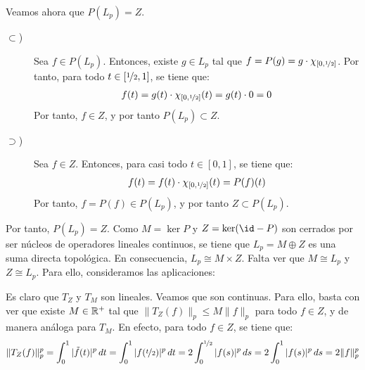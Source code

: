 \begin{ejercicio}
    Veamos ahora que $P(L_p) = Z$.
    \begin{description}
        \item[$\subset$)] Sea $f \in P(L_p)$. Entonces, existe $g \in L_p$ tal que $f = P(g) = g\cdot \chi_{[0, \nicefrac{1}{2}]}$. Por tanto, para todo $t \in [\nicefrac{1}{2}, 1]$, se tiene que:
        \begin{align*}
            f(t) = g(t)\cdot \chi_{[0, \nicefrac{1}{2}]}(t) = g(t)\cdot 0 = 0
        \end{align*}
        Por tanto, $f \in Z$, y por tanto $P(L_p) \subset Z$.
        \item[$\supset$)] Sea $f \in Z$. Entonces, para casi todo $t \in [0, 1]$, se tiene que:
        \begin{align*}
            f(t) = f(t)\cdot \chi_{[0, \nicefrac{1}{2}]}(t) = P(f)(t)
        \end{align*}
        Por tanto, $f = P(f) \in P(L_p)$, y por tanto $Z \subset P(L_p)$. 
    \end{description}

    Por tanto, $P(L_p) = Z$. Como $M=\ker P$ y $Z=\ker(\id - P)$ son cerrados por ser núcleos de operadores lineales continuos, se tiene que $L_p = M \oplus Z$ es una suma directa topológica. En consecuencia, $L_p\cong M \times Z$. Falta ver que $M \cong L_p$ y $Z \cong L_p$. Para ello, consideramos las aplicaciones:

    Es claro que $T_Z$ y $T_M$ son lineales. Veamos que son continuas. Para ello, basta con ver que existe $M \in \mathbb{R}^+$ tal que $\|T_Z(f)\|_p \leq M \|f\|_p$ para todo $f \in Z$, y de manera análoga para $T_M$. En efecto, para todo $f \in Z$, se tiene que:
    \begin{align*}
        \|T_Z(f)\|_p^p = \int_{0}^1 |\tilde{f}(t)|^p\,dt = \int_{0}^1 |f(\nicefrac{t}{2})|^p\,dt = 2 \int_{0}^{\nicefrac{1}{2}} |f(s)|^p\,ds = 2 \int_{0}^{1} |f(s)|^p\,ds = 2 \|f\|_p^p
    \end{align*}


\end{ejercicio}
